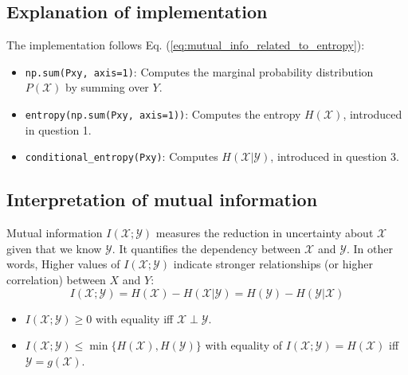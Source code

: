\documentclass{article}
\begin{document}
\subsection*{Explanation of implementation}

The implementation follows Eq. (\ref{eq:mutual_info_related_to_entropy}):
\begin{itemize}
    \item \texttt{np.sum(Pxy, axis=1)}: Computes the marginal probability distribution $P(\mathcal{X})$ by summing over $Y$.
    \item \texttt{entropy(np.sum(Pxy, axis=1))}: Computes the entropy $H(\mathcal{X})$, introduced in question 1.
    \item \texttt{conditional\_entropy(Pxy)}: Computes $H(\mathcal{X} | \mathcal{Y})$, introduced in question 3.
\end{itemize}


\subsection*{Interpretation of mutual information}

Mutual information $I(\mathcal{X};\mathcal{Y})$ measures the reduction in uncertainty about $\mathcal{X}$ given that we know $\mathcal{Y}$. It quantifies the dependency between $\mathcal{X}$ and $\mathcal{Y}$. In other words, Higher values of $I(\mathcal{X};\mathcal{Y})$ indicate stronger relationships (or higher correlation) between $X$ and $Y$:
\begin{equation}
    I(\mathcal{X};\mathcal{Y}) = H(\mathcal{X}) - H(\mathcal{X}|\mathcal{Y}) = H(\mathcal{Y}) - H(\mathcal{Y}|\mathcal{X})
\label{eq:mutual_info_related_to_entropy}
\end{equation}
\begin{itemize}
    \item $I(\mathcal{X};\mathcal{Y}) \geq 0$ with equality iff $\mathcal{X} \perp \mathcal{Y}$.
    \item $I(\mathcal{X};\mathcal{Y}) \leq \min \{H(\mathcal{X}), H(\mathcal{Y})\}$ with equality of $I(\mathcal{X};\mathcal{Y}) = H(\mathcal{X})$ iff $\mathcal{Y} = g(\mathcal{X})$.
\end{itemize}
\end{document}
